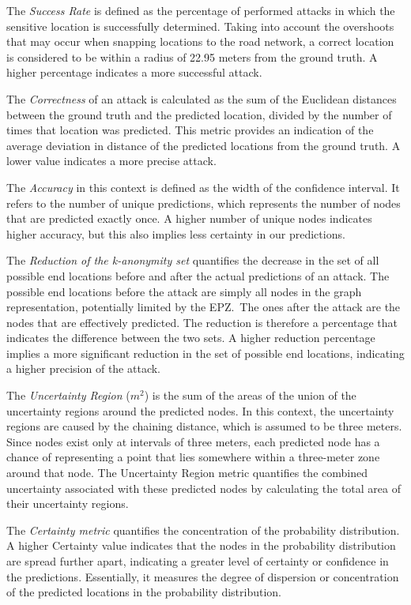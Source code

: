 \documentclass[conference]{IEEEtran}
\begin{document}
The \textit{Success Rate} is defined as the percentage of performed attacks in
which the sensitive location is successfully determined. Taking into account
the overshoots that may occur when snapping locations to the road network, a
correct location is considered to be within a radius of 22.95 meters from the
ground truth. A higher percentage indicates a more successful attack.

The \textit{Correctness} of an attack is calculated as the sum of the Euclidean
distances between the ground truth and the predicted location, divided by the
number of times that location was predicted. This metric provides an indication
of the average deviation in distance of the predicted locations from the ground
truth. A lower value indicates a more precise attack.

The \textit{Accuracy} in this context is defined as the width of the confidence
interval. It refers to the number of unique predictions, which represents the
number of nodes that are predicted exactly once. A higher number of unique
nodes indicates higher accuracy, but this also implies less certainty in our
predictions.

The \textit{Reduction of the k-anonymity set} quantifies the decrease in the
set of all possible end locations before and after the actual predictions of an
attack. The possible end locations before the attack are simply all nodes in
the graph representation, potentially limited by the EPZ.\ The ones after the
attack are the nodes that are effectively predicted. The reduction is therefore
a percentage that indicates the difference between the two sets. A higher
reduction percentage implies a more significant reduction in the set of
possible end locations, indicating a higher precision of the attack.

The \textit{Uncertainty Region} ($m^2$) is the sum of the areas of the union of
the uncertainty regions around the predicted nodes. In this context, the
uncertainty regions are caused by the chaining distance, which is assumed to be
three meters. Since nodes exist only at intervals of three meters, each
predicted node has a chance of representing a point that lies somewhere within
a three-meter zone around that node. The Uncertainty Region metric quantifies
the combined uncertainty associated with these predicted nodes by calculating
the total area of their uncertainty regions.

The \textit{Certainty metric} quantifies the concentration of the probability
distribution. A higher Certainty value indicates that the nodes in the
probability distribution are spread further apart, indicating a greater level
of certainty or confidence in the predictions. Essentially, it measures the
degree of dispersion or concentration of the predicted locations in the
probability distribution.
\end{document}
